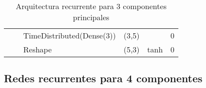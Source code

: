 \begin{table}[H]
\begin{center}
\begin{tabular}{ll|l|l|l|l|}
\multicolumn{1}{|l|}{}                                                                 &                                   & TimeDistributed(Dense(3))          & (3,5)                                &                                          & 0                                           \\ \cline{3-6} 
\multicolumn{1}{|l|}{}                                                                 &                                   & Reshape                            & (5,3)                                & tanh                                     & 0                                           \\ \hline
\end{tabular}

\end{center}
\caption{Arquitectura recurrente para 3 componentes principales}
\label{table:rnn_3}
\end{table}


\subsection{Redes recurrentes para 4 componentes}


